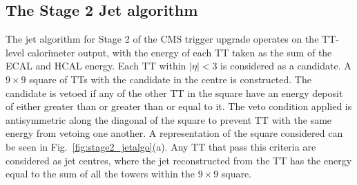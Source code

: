 \subsection{The Stage 2 Jet algorithm}
\label{sec:stage2_jetalgo}
The jet algorithm for Stage 2 of the CMS trigger upgrade operates on
the TT-level calorimeter output, with the energy of each TT taken as
the sum of the ECAL and HCAL energy. Each TT within $|\eta|<3$ is
considered as a candidate. A $9\times9$ square of TTs with the
candidate in the centre is constructed. The candidate is vetoed if any
of the other TT in the square have an energy deposit of either greater
than or greater than or equal to it. The veto condition applied is
antisymmetric along the diagonal of the square to prevent TT with the
same energy from vetoing one another. A representation of the square
considered can be seen in Fig.~\ref{fig:stage2_jetalgo}(a). Any TT
that pass this criteria are considered as jet centres, where the jet
reconstructed from the TT has the energy equal to the sum of all the
towers within the $9\times9$ square. 

